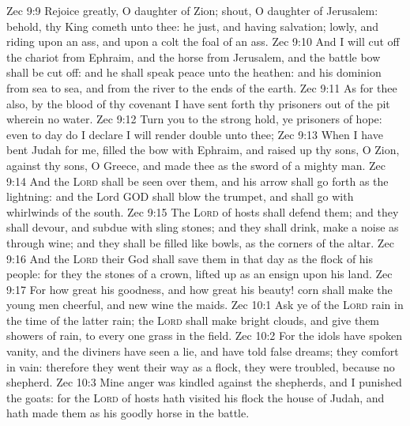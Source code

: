 \vs Zec 9:9 Rejoice greatly, O daughter of Zion; shout, O daughter of Jerusalem: behold, thy King cometh unto thee: he  just, and having salvation; lowly, and riding upon an ass, and upon a colt the foal of an ass.
\vs Zec 9:10 And I will cut off the chariot from Ephraim, and the horse from Jerusalem, and the battle bow shall be cut off: and he shall speak peace unto the heathen: and his dominion  from sea  to sea, and from the river  to the ends of the earth.
\vs Zec 9:11 As for thee also, by the blood of thy covenant I have sent forth thy prisoners out of the pit wherein  no water.
\vs Zec 9:12 Turn you to the strong hold, ye prisoners of hope: even to day do I declare  I will render double unto thee;
\vs Zec 9:13 When I have bent Judah for me, filled the bow with Ephraim, and raised up thy sons, O Zion, against thy sons, O Greece, and made thee as the sword of a mighty man.
\vs Zec 9:14 And the \textsc{Lord} shall be seen over them, and his arrow shall go forth as the lightning: and the Lord GOD shall blow the trumpet, and shall go with whirlwinds of the south.
\vs Zec 9:15 The \textsc{Lord} of hosts shall defend them; and they shall devour, and subdue with sling stones; and they shall drink,  make a noise as through wine; and they shall be filled like bowls,  as the corners of the altar.
\vs Zec 9:16 And the \textsc{Lord} their God shall save them in that day as the flock of his people: for they  the stones of a crown, lifted up as an ensign upon his land.
\vs Zec 9:17 For how great  his goodness, and how great  his beauty! corn shall make the young men cheerful, and new wine the maids.
\vs Zec 10:1 Ask ye of the \textsc{Lord} rain in the time of the latter rain;  the \textsc{Lord} shall make bright clouds, and give them showers of rain, to every one grass in the field.
\vs Zec 10:2 For the idols have spoken vanity, and the diviners have seen a lie, and have told false dreams; they comfort in vain: therefore they went their way as a flock, they were troubled, because  no shepherd.
\vs Zec 10:3 Mine anger was kindled against the shepherds, and I punished the goats: for the \textsc{Lord} of hosts hath visited his flock the house of Judah, and hath made them as his goodly horse in the battle.
